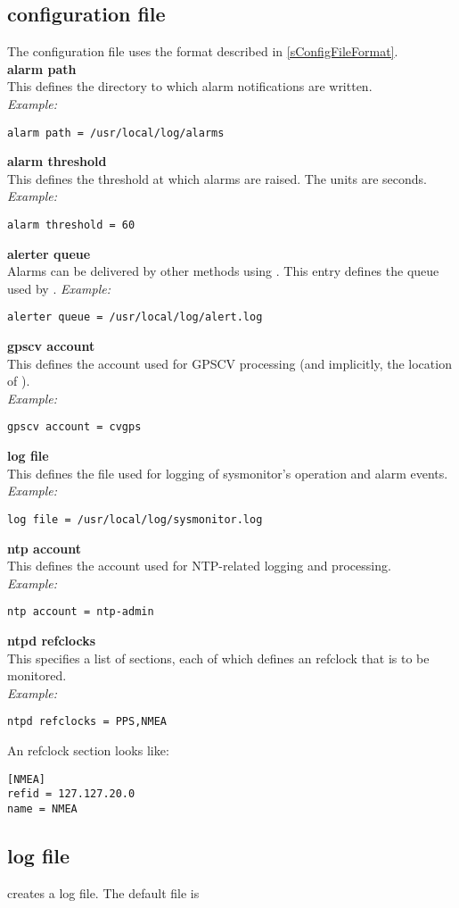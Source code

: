 \subsection{configuration file}

The configuration file uses the format described in \ref{sConfigFileFormat}.\\

{\bfseries alarm path}\\
This defines the  directory to which alarm notifications are written.\\
\textit{Example:}
\begin{lstlisting}
alarm path = /usr/local/log/alarms
\end{lstlisting}
{\bfseries alarm threshold}\\
This defines the  threshold at which alarms are raised. The units are seconds.\\
\textit{Example:}
\begin{lstlisting}
alarm threshold = 60
\end{lstlisting}
{\bfseries alerter queue}\\
Alarms can be delivered by other methods using . This entry defines the queue used by .
\textit{Example:}
\begin{lstlisting}
alerter queue = /usr/local/log/alert.log
\end{lstlisting}
{\bfseries gpscv account}\\
This defines the account used for GPSCV processing (and implicitly, the location of ).\\
\textit{Example:}
\begin{lstlisting}
gpscv account = cvgps
\end{lstlisting}
{\bfseries log file}\\
This defines the file used for logging of sysmonitor's operation and alarm events.\\
\textit{Example:}
\begin{lstlisting}
log file = /usr/local/log/sysmonitor.log
\end{lstlisting}
{\bfseries ntp account}\\
This defines the account used for NTP-related logging and processing.\\
\textit{Example:}
\begin{lstlisting}
ntp account = ntp-admin
\end{lstlisting}
{\bfseries ntpd refclocks}\\
This specifies a list of sections, each of which defines an  refclock that is to be monitored.\\
\textit{Example:}
\begin{lstlisting}
ntpd refclocks = PPS,NMEA
\end{lstlisting}

An  refclock section looks like:\\
\begin{lstlisting}
[NMEA]
refid = 127.127.20.0
name = NMEA
\end{lstlisting}


\subsection{log file}
 creates a log file. The default file is 
